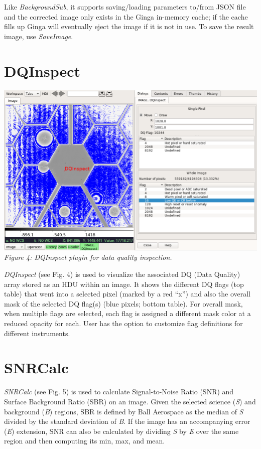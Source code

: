 \documentclass[]{article}
\begin{document}
\begin{multicols}{3}
\para
Like {\em BackgroundSub}, it supports saving/loading parameters to/from
JSON file and the corrected image only exists in the Ginga in-memory cache;
if the cache fills up Ginga will eventually eject the image if it is not
in use.  To save the result image, use {\em SaveImage}.

\section*{DQInspect}

\begin{center}
\includegraphics[width=8in]{plugin_dqinspect} \\
\vspace*{0.4em}
\label{fig:plugin_dqinspect}
{\small\em Figure 4: DQInspect plugin for data quality inspection.}
\end{center}

\para
{\em DQInspect} (see Fig. 4) is used to visualize the associated DQ (Data
Quality) array stored as an HDU within an image.
It shows the different DQ flags (top table) that went into a selected pixel
(marked by a red ``x'')
and also the overall mask of the selected DQ flag(s)
(blue pixels; bottom table).
For overall mask, when multiple flags are selected, each flag is assigned a
different mask color at a reduced opacity for each.
User has the option to customize flag definitions for different instruments.

\section*{SNRCalc}

{\em SNRCalc} (see Fig. 5) is used to calculate Signal-to-Noise Ratio
(SNR) and Surface Background Ratio (SBR) on an image.
Given the selected science ({\em S}) and background ({\em B}) regions,
SBR is defined by Ball Aerospace\cite{sbr} as the median of {\em S}
divided by the standard deviation of {\em B}.
If the image has an accompanying error ({\em E}) extension, SNR can also
be calculated by dividing {\em S} by {\em E} over the same region and
then computing its min, max, and mean.


\end{multicols}
\end{document}
